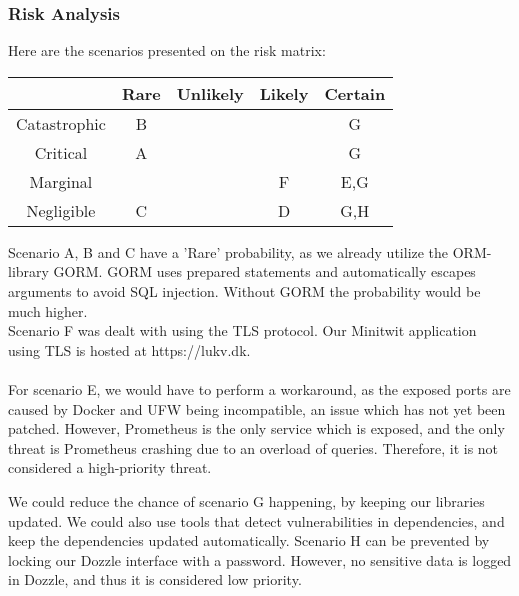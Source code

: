 \subsubsection{Risk Analysis}
Here are the scenarios presented on the risk matrix:
\begin{center}
\begin{tabular}{ |c|c|c|c|c| } 
 \hline
  & Rare & Unlikely & Likely & Certain \\ 
 \hline
 Catastrophic & B &  &  & G\\ 
 \hline
 Critical & A &  &  & G \\ 
 \hline
 Marginal & &  &  F& E,G\\ 
 \hline
 Negligible & C &  & D & G,H\\ 
 \hline
\end{tabular}
\end{center}
Scenario A, B and C have a 'Rare' probability, as we already utilize the ORM-library GORM. GORM uses prepared statements and automatically escapes arguments to avoid SQL injection. Without GORM the probability would be much higher.\\
Scenario F was dealt with using the TLS protocol. Our Minitwit application using TLS is hosted at https://lukv.dk.\\\\
For scenario E, we would have to perform a workaround, as the exposed ports are caused by Docker and UFW being incompatible, an issue which has not yet been patched. However, Prometheus is the only service which is exposed, and the only threat is Prometheus crashing due to an overload of queries. Therefore, it is not considered a high-priority threat.

We could reduce the chance of scenario G happening, by keeping our libraries updated. We could also use tools that detect vulnerabilities in dependencies, and keep the dependencies updated automatically. 
Scenario H can be prevented by locking our Dozzle interface with a password. However, no sensitive data is logged in Dozzle, and thus it is considered low priority.